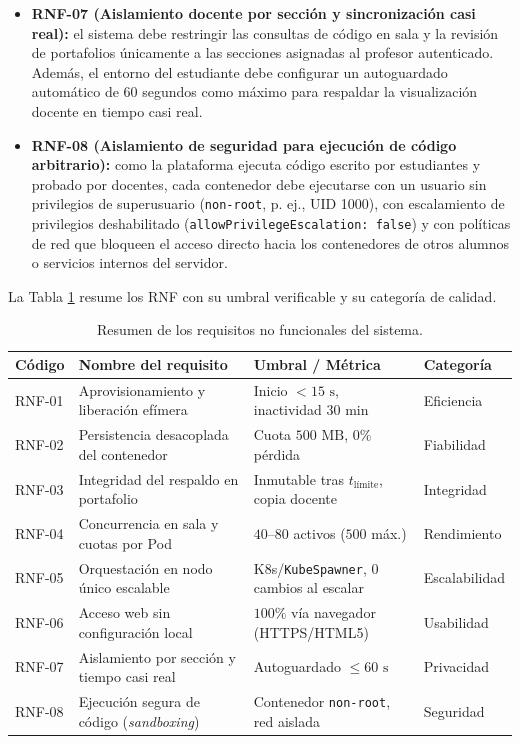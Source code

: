 \begin{itemize}
    \item \textbf{RNF-07 (Aislamiento docente por sección y sincronización casi real):} el sistema debe restringir las consultas de código en sala y la revisión de portafolios únicamente a las secciones asignadas al profesor autenticado. Además, el entorno del estudiante debe configurar un autoguardado automático de 60 segundos como máximo para respaldar la visualización docente en tiempo casi real.
    \item \textbf{RNF-08 (Aislamiento de seguridad para ejecución de código arbitrario):} como la plataforma ejecuta código escrito por estudiantes y probado por docentes, cada contenedor debe ejecutarse con un usuario sin privilegios de superusuario (\texttt{non-root}, p. ej., UID 1000), con escalamiento de privilegios deshabilitado (\texttt{allowPrivilegeEscalation: false}) y con políticas de red que bloqueen el acceso directo hacia los contenedores de otros alumnos o servicios internos del servidor.
\end{itemize}

La Tabla \ref{tab:resumen_rnf} resume los RNF con su umbral verificable y su categoría de calidad.

\begin{table}[H]
\centering
\caption{Resumen de los requisitos no funcionales del sistema.}
\label{tab:resumen_rnf}
\small
\begin{tabular}{l p{} p{} l}
\toprule
\textbf{Código} & \textbf{Nombre del requisito} & \textbf{Umbral / Métrica} & \textbf{Categoría} \\
\midrule
RNF-01 & Aprovisionamiento y liberación efímera & Inicio $< 15\text{ s}$, inactividad $30\text{ min}$ & Eficiencia \\
RNF-02 & Persistencia desacoplada del contenedor & Cuota $500\text{ MB}$, $0\%$ pérdida & Fiabilidad \\
RNF-03 & Integridad del respaldo en portafolio & Inmutable tras $t_{\text{límite}}$, copia docente & Integridad \\
RNF-04 & Concurrencia en sala y cuotas por Pod & $40$--$80$ activos ($500$ máx.) & Rendimiento \\
RNF-05 & Orquestación en nodo único escalable & K8s/\texttt{KubeSpawner}, $0$ cambios al escalar & Escalabilidad \\
RNF-06 & Acceso web sin configuración local & $100\%$ vía navegador (HTTPS/HTML5) & Usabilidad \\
RNF-07 & Aislamiento por sección y tiempo casi real & Autoguardado $\le 60\text{ s}$ & Privacidad \\
RNF-08 & Ejecución segura de código (\textit{sandboxing}) & Contenedor \texttt{non-root}, red aislada & Seguridad \\
\bottomrule
\end{tabular}
\end{table}
